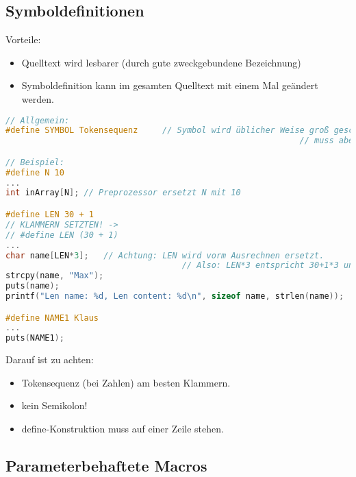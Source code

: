 \subsection{Symboldefinitionen}
Vorteile:
\begin{itemize}
\item Quelltext wird lesbarer (durch gute zweckgebundene Bezeichnung)
\item Symboldefinition kann im gesamten Quelltext mit einem Mal geändert werden.
\end{itemize}
\begin{lstlisting}[language = C]
// Allgemein:
#define SYMBOL Tokensequenz		// Symbol wird üblicher Weise groß geschrieben,
															// muss aber nicht (nur zur besseren Wiedererkennung).

// Beispiel:
#define N 10
...
int inArray[N];	// Preprozessor ersetzt N mit 10

#define LEN 30 + 1
// KLAMMERN SETZTEN! ->
// #define LEN (30 + 1)
...
char name[LEN*3];	// Achtung: LEN wird vorm Ausrechnen ersetzt. 
									// Also: LEN*3 entspricht 30+1*3 und nicht (30+1)*3
strcpy(name, "Max");
puts(name);
printf("Len name: %d, Len content: %d\n", sizeof name, strlen(name));

#define NAME1 Klaus
...
puts(NAME1);
\end{lstlisting}

Darauf ist zu achten:
\begin{itemize}
\item Tokensequenz (bei Zahlen) am besten Klammern.
\item kein Semikolon!
\item define-Konstruktion muss auf einer Zeile stehen.
\end{itemize}

\subsection{Parameterbehaftete Macros}

